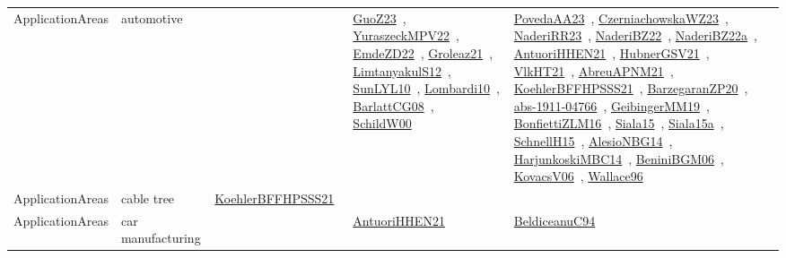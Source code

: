 {\begin{longtable}{lp{3cm}>{\raggedright\arraybackslash}p{6cm}>{\raggedright\arraybackslash}p{6cm}>{\raggedright\arraybackslash}p{8cm}}
ApplicationAreas & automotive &  & \href{../works/GuoZ23.pdf}{GuoZ23}~\cite{GuoZ23}, \href{../works/YuraszeckMPV22.pdf}{YuraszeckMPV22}~\cite{YuraszeckMPV22}, \href{../works/EmdeZD22.pdf}{EmdeZD22}~\cite{EmdeZD22}, \href{../works/Groleaz21.pdf}{Groleaz21}~\cite{Groleaz21}, \href{../works/LimtanyakulS12.pdf}{LimtanyakulS12}~\cite{LimtanyakulS12}, \href{../works/SunLYL10.pdf}{SunLYL10}~\cite{SunLYL10}, \href{../works/Lombardi10.pdf}{Lombardi10}~\cite{Lombardi10}, \href{../works/BarlattCG08.pdf}{BarlattCG08}~\cite{BarlattCG08}, \href{../works/SchildW00.pdf}{SchildW00}~\cite{SchildW00} & \href{../works/PovedaAA23.pdf}{PovedaAA23}~\cite{PovedaAA23}, \href{../works/CzerniachowskaWZ23.pdf}{CzerniachowskaWZ23}~\cite{CzerniachowskaWZ23}, \href{../works/NaderiRR23.pdf}{NaderiRR23}~\cite{NaderiRR23}, \href{../works/NaderiBZ22.pdf}{NaderiBZ22}~\cite{NaderiBZ22}, \href{../works/NaderiBZ22a.pdf}{NaderiBZ22a}~\cite{NaderiBZ22a}, \href{../works/AntuoriHHEN21.pdf}{AntuoriHHEN21}~\cite{AntuoriHHEN21}, \href{../works/HubnerGSV21.pdf}{HubnerGSV21}~\cite{HubnerGSV21}, \href{../works/VlkHT21.pdf}{VlkHT21}~\cite{VlkHT21}, \href{../works/AbreuAPNM21.pdf}{AbreuAPNM21}~\cite{AbreuAPNM21}, \href{../works/KoehlerBFFHPSSS21.pdf}{KoehlerBFFHPSSS21}~\cite{KoehlerBFFHPSSS21}, \href{../works/BarzegaranZP20.pdf}{BarzegaranZP20}~\cite{BarzegaranZP20}, \href{../works/abs-1911-04766.pdf}{abs-1911-04766}~\cite{abs-1911-04766}, \href{../works/GeibingerMM19.pdf}{GeibingerMM19}~\cite{GeibingerMM19}, \href{../works/BonfiettiZLM16.pdf}{BonfiettiZLM16}~\cite{BonfiettiZLM16}, \href{../works/Siala15.pdf}{Siala15}~\cite{Siala15}, \href{../works/Siala15a.pdf}{Siala15a}~\cite{Siala15a}, \href{../works/SchnellH15.pdf}{SchnellH15}~\cite{SchnellH15}, \href{../works/AlesioNBG14.pdf}{AlesioNBG14}~\cite{AlesioNBG14}, \href{../works/HarjunkoskiMBC14.pdf}{HarjunkoskiMBC14}~\cite{HarjunkoskiMBC14}, \href{../works/BeniniBGM06.pdf}{BeniniBGM06}~\cite{BeniniBGM06}, \href{../works/KovacsV06.pdf}{KovacsV06}~\cite{KovacsV06}, \href{../works/Wallace96.pdf}{Wallace96}~\cite{Wallace96}\\
ApplicationAreas & cable tree & \href{../works/KoehlerBFFHPSSS21.pdf}{KoehlerBFFHPSSS21}~\cite{KoehlerBFFHPSSS21} &  & \\
ApplicationAreas & car manufacturing &  & \href{../works/AntuoriHHEN21.pdf}{AntuoriHHEN21}~\cite{AntuoriHHEN21} & \href{../works/BeldiceanuC94.pdf}{BeldiceanuC94}~\cite{BeldiceanuC94}\\

\end{longtable}}
